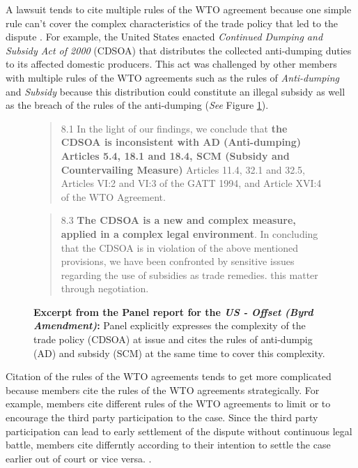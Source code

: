 A lawsuit tends to cite multiple rules of the WTO agreement because one simple rule can't cover the complex characteristics of the trade policy that led to the dispute \citep{palmeter2004dispute}.
For example, the United States enacted \textit{Continued Dumping and Subsidy Act of 2000} (CDSOA) that distributes
the collected anti-dumping duties to its affected domestic producers.
This act was challenged by other members with multiple rules of
the WTO agreements such as the rules of \textit{Anti-dumping} and \textit{Subsidy} because
this distribution could constitute an illegal subsidy as well as the breach of the rules of the anti-dumping (\textit{See} Figure \ref{fig:complex-measure}).

\begin{figure}[h]
    \begin{quote}
        8.1 In the light of our findings, we conclude that \textbf{the CDSOA is inconsistent with AD (Anti-dumping)
        Articles 5.4, 18.1 and 18.4, SCM (Subsidy and Countervailing Measure)} Articles 11.4, 32.1 and 32.5, Articles VI:2 and VI:3 of the GATT
        1994, and Article XVI:4 of the WTO Agreement.
    \end{quote} 
    \begin{quote}
        \centering{\ldots}
    \end{quote}
    \begin{quote}
        8.3 \textbf{The CDSOA is a new and complex measure, applied in a complex legal environment}. In
        concluding that the CDSOA is in violation of the above mentioned provisions, we have been
        confronted by sensitive issues regarding the use of subsidies as trade remedies.
        this matter through negotiation.
    \end{quote} 
    \caption{\textbf{Excerpt from the Panel report for the \textit{US - Offset (Byrd Amendment)}:} Panel explicitly expresses the complexity of the trade policy (CDSOA) at issue and cites the rules of anti-dumpig (AD) and subsidy (SCM) at the same time to cover this complexity.}
    \label{fig:complex-measure}
\end{figure}


Citation of the rules of the WTO agreements tends to get more complicated because members cite the
rules of the WTO agreements strategically. For example,
members cite different rules of the WTO agreements to limit or to encourage
the third party participation to the case. Since the third party participation
can lead to early settlement of the dispute without continuous
legal battle, members cite differntly according to their intention to
settle the case earlier out of court or vice versa.
\citep{who_gets}.

